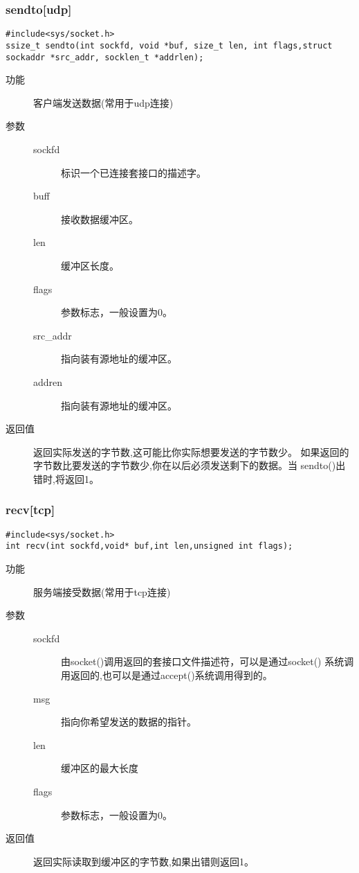 \subsubsection{sendto[udp]}
\begin{lstlisting}[style=C]
#include<sys/socket.h>
ssize_t sendto(int sockfd, void *buf, size_t len, int flags,struct sockaddr *src_addr, socklen_t *addrlen);
\end{lstlisting}
\begin{description}
\item[功能]	客户端发送数据(常用于udp连接)
\item[参数]		 
\begin{description}
\item[sockfd]	标识一个已连接套接口的描述字。
\item[buff]		接收数据缓冲区。　
\item[len]		缓冲区长度。　
\item[flags]		参数标志，一般设置为0。
\item[src\_{}addr]	指向装有源地址的缓冲区。
\item[addren]	指向装有源地址的缓冲区。	
\end{description}
\item[返回值]		返回实际发送的字节数,这可能比你实际想要发送的字节数少。
如果返回的字节数比要发送的字节数少,你在以后必须发送剩下的数据。当
sendto()出错时,将返回­1。
\end{description}


\subsubsection{recv[tcp]}
\begin{lstlisting}[style=C]
#include<sys/socket.h>
int recv(int sockfd,void* buf,int len,unsigned int flags);
\end{lstlisting}
\begin{description}
\item[功能]	服务端接受数据(常用于tcp连接)
\item[参数]		 
\begin{description}
\item[sockfd]	由socket()调用返回的套接口文件描述符，可以是通过socket()
系统调用返回的,也可以是通过accept()系统调用得到的。
\item[msg]		指向你希望发送的数据的指针。
\item[len]		缓冲区的最大长度
\item[flags]		参数标志，一般设置为0。
\end{description}
\item[返回值]		返回实际读取到缓冲区的字节数,如果出错则返回­1。
\end{description}


